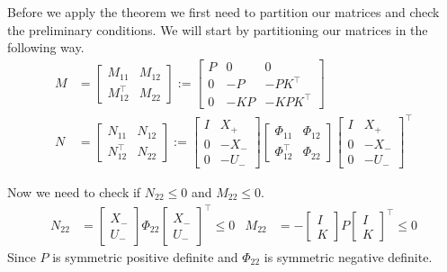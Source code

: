 Before we apply the theorem we first need to partition our matrices and check the preliminary conditions. We will start by partitioning our matrices in the following way.
\begin{subequations} \label{NData}
	\begin{align} 
		M &= 
		\left[ \begin{array}{c|c}
			M_{11} & M_{12} \\ \hline M_{12}^\top & M_{22}
		\end{array} \right] 
		:=
		\left[ \begin{array}{c|cc}
		P&0&0 \\ \hline 0 & -P & -PK^\top \\ 0 & -KP & -KPK^\top
		\end{array} \right] \\
		N &= 
		\left[ \begin{array}{c|c}
			N_{11} & N_{12} \\ \hline N_{12}^\top & N_{22}
		\end{array} \right] 
		:=
		\left[ \begin{array}{cc}
			I&X_+ \\ \hline 0 & -X_- \\ 0&-U_-
		\end{array} \right]
		\left[ \begin{array}{cc}
			\Phi_{11} & \Phi_{12} \\ \Phi_{12}^\top & \Phi_{22}
		\end{array} \right]
		\left[ \begin{array}{cc}
			I&X_+ \\ \hline 0 & -X_- \\ 0&-U_-
		\end{array} \right]^\top
	\end{align}
\end{subequations}

Now we need to check if $N_{22} \leq 0$ and $M_{22} \leq 0$. 
\begin{align*}
	N_{22} &= \begin{bmatrix} X_- \\ U_- \end{bmatrix} \Phi_{22} \begin{bmatrix} X_- \\ U_- \end{bmatrix}^\top \leq 0 &
	M_{22} &= - \begin{bmatrix} I \\ K \end{bmatrix} P \begin{bmatrix} I \\ K \end{bmatrix}^\top \leq 0
\end{align*}
Since $P$ is symmetric positive definite and $\Phi_{22}$ is symmetric negative definite. 

